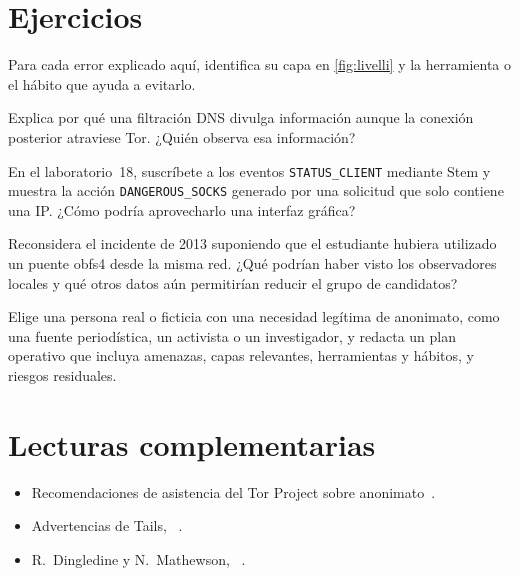 \section*{Ejercicios}

\begin{esercizio}[1]\label{es:28-livello}
Para cada error explicado aquí, identifica su capa en \cref{fig:livelli} y la herramienta o el hábito que ayuda a evitarlo.
\end{esercizio}

\begin{esercizio}[1]\label{es:28-dns}
Explica por qué una filtración DNS divulga información aunque la conexión posterior atraviese Tor. ¿Quién observa esa información?
\end{esercizio}

\begin{esercizio}[2]\label{es:28-evento}
En el laboratorio~18, suscríbete a los eventos \texttt{STATUS\_CLIENT} mediante Stem y muestra la acción \texttt{DANGEROUS\_SOCKS} generado por una solicitud que solo contiene una IP. ¿Cómo podría aprovecharlo una interfaz gráfica?
\end{esercizio}

\begin{esercizio}[2]\label{es:28-insieme}
Reconsidera el incidente de 2013 suponiendo que el estudiante hubiera utilizado un puente obfs4 desde la misma red. ¿Qué podrían haber visto los observadores locales y qué otros datos aún permitirían reducir el grupo de candidatos?
\end{esercizio}

\begin{esercizio}[3]\label{es:28-modello}
Elige una persona real o ficticia con una necesidad legítima de anonimato, como una fuente periodística, un activista o un investigador, y redacta un plan operativo que incluya amenazas, capas relevantes, herramientas y hábitos, y riesgos residuales.
\end{esercizio}

\section*{Lecturas complementarias}
\begin{itemize}
  \item Recomendaciones de asistencia del Tor Project sobre anonimato~\cite{torsafety}.
  \item Advertencias de Tails, ~\cite{tailswarnings}.
  \item R.~Dingledine y N.~Mathewson, ~\cite{dingledine2006company}.
\end{itemize}

